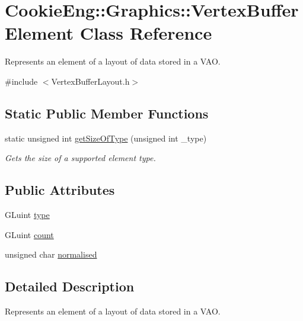 \hypertarget{struct_cookie_eng_1_1_graphics_1_1_vertex_buffer_element}{}\section{Cookie\+Eng\+:\+:Graphics\+:\+:Vertex\+Buffer\+Element Class Reference}
\label{struct_cookie_eng_1_1_graphics_1_1_vertex_buffer_element}


Represents an element of a layout of data stored in a V\+AO.  




{\ttfamily \#include $<$Vertex\+Buffer\+Layout.\+h$>$}

\subsection*{Static Public Member Functions}
\begin{DoxyCompactItemize}
\item 
static unsigned int \hyperlink{struct_cookie_eng_1_1_graphics_1_1_vertex_buffer_element_a2041f09a7eb0714959f1be6f67fb111b}{get\+Size\+Of\+Type} (unsigned int \+\_\+type)
\begin{DoxyCompactList}\small\item\em Gets the size of a supported element type. \end{DoxyCompactList}\end{DoxyCompactItemize}
\subsection*{Public Attributes}
\begin{DoxyCompactItemize}
\item 
G\+Luint \hyperlink{struct_cookie_eng_1_1_graphics_1_1_vertex_buffer_element_abba091f340c618809735781f80ccee6b}{type}
\item 
G\+Luint \hyperlink{struct_cookie_eng_1_1_graphics_1_1_vertex_buffer_element_a5c5d5a5861ed76486f0ea36e8db6ed4c}{count}
\item 
unsigned char \hyperlink{struct_cookie_eng_1_1_graphics_1_1_vertex_buffer_element_a1a50c45bd6f7e11f158b142ec20552ba}{normalised}
\end{DoxyCompactItemize}


\subsection{Detailed Description}
Represents an element of a layout of data stored in a V\+AO. 

